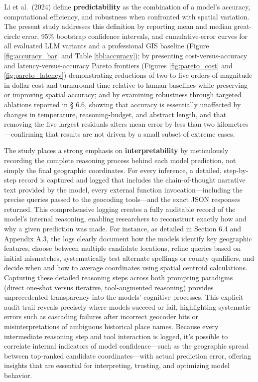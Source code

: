 Li et al.~(2024) define \textbf{predictability} as the combination of a
model's accuracy, computational efficiency, and robustness when
confronted with spatial variation. The present study addresses this
definition by reporting mean and median great-circle error, 95\%
bootstrap confidence intervals, and cumulative-error curves for all
evaluated LLM variants and a professional GIS baseline (Figure
\ref{fig:accuracy_bar} and Table \ref{tbl:accuracy}); by presenting
cost-versus-accuracy and latency-versus-accuracy Pareto frontiers
(Figures \ref{fig:pareto_cost} and \ref{fig:pareto_latency})
demonstrating reductions of two to five orders-of-magnitude in dollar
cost and turnaround time relative to human baselines while preserving or
improving spatial accuracy; and by examining robustness through targeted
ablations reported in § 6.6, showing that accuracy is essentially
unaffected by changes in temperature, reasoning-budget, and abstract
length, and that removing the five largest residuals alters mean error
by less than two kilometres---confirming that results are not driven by
a small subset of extreme cases.

The study places a strong emphasis on \textbf{interpretability} by
meticulously recording the complete reasoning process behind each model
prediction, not simply the final geographic coordinates. For every
inference, a detailed, step-by-step record is captured and logged that
includes the chain-of-thought narrative text provided by the model,
every external function invocation---including the precise queries
passed to the geocoding tools---and the exact JSON responses returned.
This comprehensive logging creates a fully auditable record of the
model's internal reasoning, enabling researchers to reconstruct exactly
how and why a given prediction was made. For instance, as detailed in
Section 6.4 and Appendix A.3, the logs clearly document how the models
identify key geographic features, choose between multiple candidate
locations, refine queries based on initial mismatches, systematically
test alternate spellings or county qualifiers, and decide when and how
to average coordinates using spatial centroid calculations. Capturing
these detailed reasoning steps across both prompting paradigms (direct
one-shot versus iterative, tool-augmented reasoning) provides
unprecedented transparency into the models' cognitive processes. This
explicit audit trail reveals precisely where models succeed or fail,
highlighting systematic errors such as cascading failures after
incorrect geocoder hits or misinterpretations of ambiguous historical
place names. Because every intermediate reasoning step and tool
interaction is logged, it's possible to correlate internal indicators of
model confidence---such as the geographic spread between top-ranked
candidate coordinates---with actual prediction error, offering insights
that are essential for interpreting, trusting, and optimizing model
behavior.

